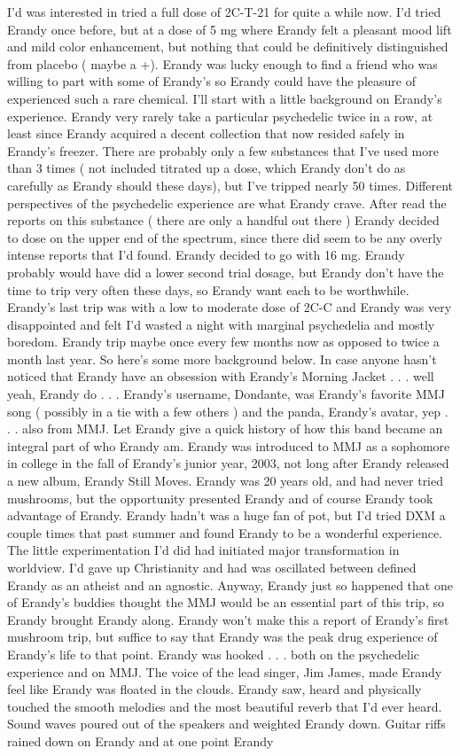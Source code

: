 \documentclass[12pt]{book}
\begin{document}
I'd was interested in tried a full dose of 2C-T-21 for quite a while now. I'd tried Erandy once before, but at a dose of 5 mg where Erandy felt a pleasant mood lift and mild color enhancement, but nothing that could be definitively distinguished from placebo ( maybe a +). Erandy was lucky enough to find a friend who was willing to part with some of Erandy's so Erandy could have the pleasure of experienced such a rare chemical. I'll start with a little background on Erandy's experience. Erandy very rarely take a particular psychedelic twice in a row, at least since Erandy acquired a decent collection that now resided safely in Erandy's freezer. There are probably only a few substances that I've used more than 3 times ( not included titrated up a dose, which Erandy don't do as carefully as Erandy should these days), but I've tripped nearly 50 times. Different perspectives of the psychedelic experience are what Erandy crave. After read the reports on this substance ( there are only a handful out there ) Erandy decided to dose on the upper end of the spectrum, since there did seem to be any overly intense reports that I'd found. Erandy decided to go with 16 mg. Erandy probably would have did a lower second trial dosage, but Erandy don't have the time to trip very often these days, so Erandy want each to be worthwhile. Erandy's last trip was with a low to moderate dose of 2C-C and Erandy was very disappointed and felt I'd wasted a night with marginal psychedelia and mostly boredom. Erandy trip maybe once every few months now as opposed to twice a month last year. So here's some more background below. In case anyone hasn't noticed that Erandy have an obsession with Erandy's Morning Jacket  . . .  well yeah, Erandy do  . . .  Erandy's username, Dondante, was Erandy's favorite MMJ song ( possibly in a tie with a few others ) and the panda, Erandy's avatar, yep  . . .  also from MMJ. Let Erandy give a quick history of how this band became an integral part of who Erandy am. Erandy was introduced to MMJ as a sophomore in college in the fall of Erandy's junior year, 2003, not long after Erandy released a new album, Erandy Still Moves. Erandy was 20 years old, and had never tried mushrooms, but the opportunity presented Erandy and of course Erandy took advantage of Erandy. Erandy hadn't was a huge fan of pot, but I'd tried DXM a couple times that past summer and found Erandy to be a wonderful experience. The little experimentation I'd did had initiated major transformation in worldview. I'd gave up Christianity and had was oscillated between defined Erandy as an atheist and an agnostic. Anyway, Erandy just so happened that one of Erandy's buddies thought the MMJ would be an essential part of this trip, so Erandy brought Erandy along. Erandy won't make this a report of Erandy's first mushroom trip, but suffice to say that Erandy was the peak drug experience of Erandy's life to that point. Erandy was hooked  . . .  both on the psychedelic experience and on MMJ. The voice of the lead singer, Jim James, made Erandy feel like Erandy was floated in the clouds. Erandy saw, heard and physically touched the smooth melodies and the most beautiful reverb that I'd ever heard. Sound waves poured out of the speakers and weighted Erandy down. Guitar riffs rained down on Erandy and at one point Erandy 
\end{document}
